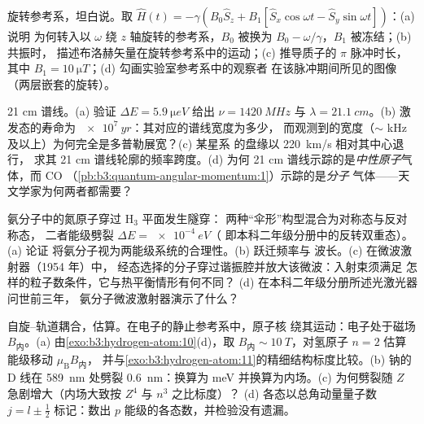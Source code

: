 \begin{exercise}[$\star\star$]\label{exo:b3:spin-two-level:7}
旋转参考系，坦白说。取 $\hat H(t) = -\gamma(B_0\hat S_z
+ B_1[\hat S_x\cos\omega t - \hat S_y\sin\omega t])$：(a) 说明
为何转入以 $\omega$ 绕 $z$ 轴旋转的参考系，$B_0$ 被换为
$B_0 - \omega/\gamma$，$B_1$ 被冻结；(b) 共振时，
描述布洛赫矢量在旋转参考系中的运动；(c)
推导质子的 $\pi$ 脉冲时长，其中 $B_1 =
\qty{10}{\micro T}$；(d) 勾画实验室参考系中的观察者
在该脉冲期间所见的图像（两层嵌套的旋转）。
\end{exercise}

\begin{exercise}[$\star\star$]\label{exo:b3:spin-two-level:8}
21 cm 谱线。(a) 验证 $\Delta E = \qty{5.9}{\micro eV}$
给出 $\nu = \qty{1420}{MHz}$ 与 $\lambda = \qty{21.1}{cm}$。(b)
激发态的寿命为 $\qty{e7}{yr}$：其对应的谱线宽度为多少，
而观测到的宽度（$\sim$ kHz 及以上）为何完全是多普勒展宽？(c) 某星系
的盘缘以 \qty{220}{km/s} 相对其中心退行，
求其 21 cm 谱线轮廓的频率跨度。(d) 为何
21 cm 谱线示踪的是\emph{中性原子}气体，而 CO
（\cref{pb:b3:quantum-angular-momentum:1}）示踪的是\emph{分子}
气体——天文学家为何两者都需要？
\end{exercise}

\begin{exercise}[$\star\star$]\label{exo:b3:spin-two-level:9}
氨分子中的氮原子穿过 H$_3$ 平面发生隧穿：
两种“伞形”构型混合为对称态与反对称态，
二者能级劈裂 $\Delta E = \qty{e-4}{eV}$（
即本科二年级分册中的反转双重态）。(a) 论证
将氨分子视为两能级系统的合理性。(b) 跃迁频率与
波长。(c) 在微波激射器（1954 年）中，
经态选择的分子穿过谐振腔并放大该微波：入射束须满足
怎样的粒子数条件，它与热平衡情形有何不同？
(d) 在本科二年级分册所述光激光器问世前三年，
氨分子微波激射器演示了什么？
\end{exercise}

\begin{exercise}[$\star\star\star$]\label{exo:b3:spin-two-level:10}
自旋–轨道耦合，估算。在电子的静止参考系中，原子核
绕其运动：电子处于磁场 $B_{\text
{内}}$。(a) 由\cref{exo:b3:hydrogen-atom:10}(d)，取
$B_{\text{内}} \sim \qty{10}{T}$，对氢原子 $n = 2$ 估算
能级移动 $\mu_{\text{B}}B_{\text{内}}$，
并与\cref{exo:b3:hydrogen-atom:11}的精细结构标度比较。(b) 钠的
D 线在 \qty{589}{nm} 处劈裂 \qty{0.6}{nm}：换算为 meV
并换算为内场。(c) 为何劈裂随
$Z$ 急剧增大（内场大致按 $Z^4$ 与 $n^3$ 之比标度）？
(d) 各态以总角动量量子数 $j = l \pm \tfrac12$ 标记：数出
$p$ 能级的各态数，并检验没有遗漏。
\end{exercise}

